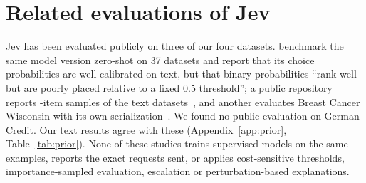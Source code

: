 \section{Related evaluations of Jev}
\label{sec:related}

Jev has been evaluated publicly on three of our four datasets. \citet{deusser2026jev} benchmark
the same model version zero-shot on 37 datasets and report that its choice probabilities are well
calibrated on text, but that binary probabilities ``rank well but are poorly placed relative to a
fixed 0.5 threshold''; a public repository reports \PriorNJevbenchSst-item samples of the text
datasets~\citep{jevbench2026}, and another evaluates Breast Cancer Wisconsin with its own
serialization~\citep{statsguysam2026}. We found no public evaluation on German Credit. Our text
results agree with these (Appendix~\ref{app:prior}, Table~\ref{tab:prior}). None of these studies
trains supervised models on the same examples, reports the exact requests sent, or applies
cost-sensitive thresholds, importance-sampled evaluation, escalation or perturbation-based
explanations.
